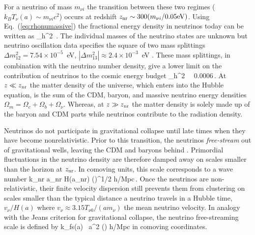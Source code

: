 For a neutrino of mass $m_{\nu i}$ the transition between these two regimes ($k_B T_\nu(a) \sim m_{\nu i} c^2$) occurs at redshift $z_{\rm nr} \sim 300 (m_{\nu i}/0.05 {\rm eV})$. Using Eq.~(\ref{eq:rhonumassive}) the fractional energy density in neutrinos today can be written as
\beq
\Omega_\nu h^2 \approx {}\,.
\eeq
The individual masses of the neutrino states are unknown but neutrino oscillation data specifies the square of two mass splittings $\Delta m_{12}^2 = 7.54 \times 10^{-5}$~eV, $|\Delta m_{13}^2|\approx 2.4 \times 10^{-3}$~eV \cite{Agashe:2014kda}. These mass splittings, in combination with the neutrino number density, give a lower limit on the contribution of neutrinos to the cosmic energy budget
\beq
\Omega_\nu h^2 \,  \gtrsim \, 0.0006\,.
\eeq
At $z \ll z_{\rm nr}$ the matter density of the universe, which enters into the Hubble equation, is the sum of the CDM, baryon, and massive neutrino energy densities $\Omega_m = \Omega_c + \Omega_b + \Omega_\nu$. Whereas, at $z\gg z_{\rm nr}$ the matter density is solely made up of the baryon and CDM parts while neutrinos contribute to the radiation density. 

Neutrinos do not participate in gravitational collapse until late times when they have become nonrelativistic. Prior to this transition, the neutrinos {\em free-stream} out of gravitational wells, leaving the CDM and baryons behind  \cite{Bond:1983hb, Ma:1996za, Hu:1997vi, Hu:1997mj}. Primordial fluctuations in the neutrino density are therefore damped away on scales smaller than the horizon at $z_{\rm nr}$. In comoving units, this scale corresponds to a wave number
\beq
k_{\rm nr} \equiv a_{\rm nr} H(a_{\rm nr})  \left(\right)^{1/2} h/{\rm Mpc}\,.
\eeq
Once the neutrinos are non-relativistic, their finite velocity dispersion still prevents them from clustering on scales smaller than the typical distance a neutrino travels in a Hubble time, $v_\nu /H(a)$ where $v_\nu \approx 3.15 T_{\nu 0}/(a m_\nu)$ the mean neutrino velocity. In analogy with the Jeans criterion for gravitational collapse, the neutrino free-streaming scale is defined by \cite{Bond:1983hb, Lesgourgues:2006nd}
\beq
k_{\rm fs}(a) \equiv {} \, a^2 \left(\right) h/{\rm Mpc}
\eeq
in comoving coordinates. 

